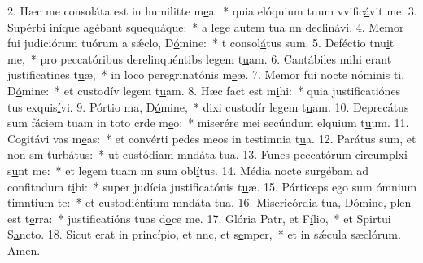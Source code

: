 2. Hæc me consoláta est in humilitte m\uline{e}a:~* quia elóquium tuum vvific\uline{á}vit me.
3. Supérbi iníque agébant sque\uline{quá}que:~* a lege autem tua nn declin\uline{á}vi.
4. Memor fui judiciórum tuórum a sǽclo, D\uline{ó}mine:~* t consol\uline{á}tus sum.
5. Deféctio tnu\uline{i}t me,~* pro peccatóribus derelinquéntibs legem t\uline{u}am.
6. Cantábiles mihi erant justificatines t\uline{u}æ,~* in loco peregrinatónis m\uline{e}æ.
7. Memor fui nocte nóminis ti, D\uline{ó}mine:~* et custodív legem t\uline{u}am.
8. Hæc fact est m\uline{i}hi:~* quia justificatiónes tus exquis\uline{í}vi.
9. Pórtio ma, D\uline{ó}mine,~* dixi custodír legem t\uline{u}am.
10. Deprecátus sum fáciem tuam in toto crde m\uline{e}o:~* miserére mei secúndum elquium t\uline{u}um.
11. Cogitávi vas m\uline{e}as:~* et convérti pedes meos in testimnia t\uline{u}a.
12. Parátus sum, et non sm turb\uline{á}tus:~* ut custódiam mndáta t\uline{u}a.
13. Funes peccatórum circumplxi s\uline{u}nt me:~* et legem tuam nn sum obl\uline{í}tus.
14. Média nocte surgébam ad confitndum t\uline{i}bi:~* super judícia justificatónis t\uline{u}æ.
15. Párticeps ego sum ómnium timnti\uline{u}m te:~* et custodiéntium mndáta t\uline{u}a.
16. Misericórdia tua, Dómine, plen est t\uline{e}rra:~* justificatións tuas d\uline{o}ce me.
17. Glória Patr, et F\uline{í}lio,~* et Spirtui S\uline{a}ncto.
18. Sicut erat in princípio, et nnc, et s\uline{e}mper,~* et in sǽcula sæclórum. \uline{A}men.
